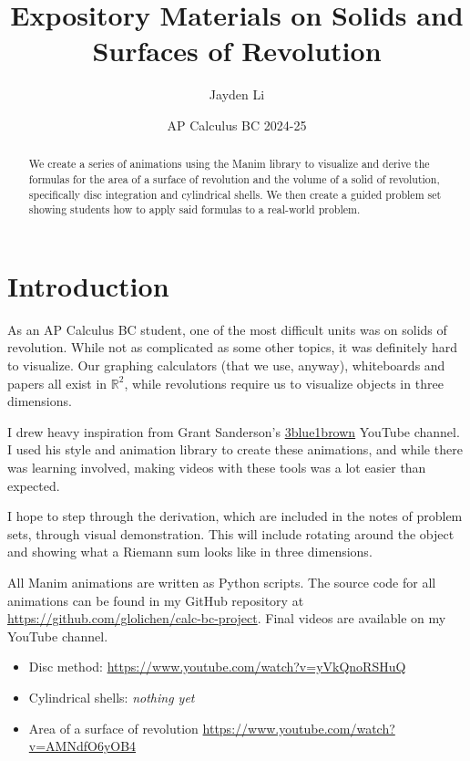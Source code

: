 \documentclass{article}
\title{\vspace*{-40pt} Expository Materials on Solids and Surfaces of Revolution}
\author{Jayden Li}
\date{AP Calculus BC 2024-25}
\begin{document}
\fontsize{11pt}{12pt}\selectfont
\setlength{\abovedisplayskip}{\abovedisplayskip/2}
\setlength{\belowdisplayskip}{\belowdisplayskip/2}
\setlength{\parindent}{0pt}
\setlength{\parskip}{2ex plus 0.5ex minus 0.2ex}
\maketitle

\begin{abstract}
	We create a series of animations using the Manim library to visualize and derive the formulas for the area of a surface of revolution and the volume of a solid of revolution, specifically disc integration and cylindrical shells. We then create a guided problem set showing students how to apply said formulas to a real-world problem.
\end{abstract}

\section{Introduction}

As an AP Calculus BC student, one of the most difficult units was on solids of revolution. While not as complicated as some other topics, it was definitely hard to visualize. Our graphing calculators (that we use, anyway), whiteboards and papers all exist in $\mathbb R^2$, while revolutions require us to visualize objects in three dimensions.

I drew heavy inspiration from Grant Sanderson's \href{https://www.youtube.com/c/3blue1brown}{3blue1brown} YouTube channel. I used his style and animation library to create these animations, and while there was learning involved, making videos with these tools was a lot easier than expected.

I hope to step through the derivation, which are included in the notes of problem sets, through visual demonstration. This will include rotating around the object and showing what a Riemann sum looks like in three dimensions.

All Manim animations are written as Python scripts. The source code for all animations can be found in my GitHub repository at \url{https://github.com/glolichen/calc-bc-project}. Final videos are available on my YouTube channel.
\begin{itemize}[topsep=0pt]
	\item Disc method: \url{https://www.youtube.com/watch?v=yVkQnoRSHuQ}
	\item Cylindrical shells: \textit{nothing yet}
	\item Area of a surface of revolution \url{https://www.youtube.com/watch?v=AMNdfO6yOB4}
\end{itemize}
\end{document}
